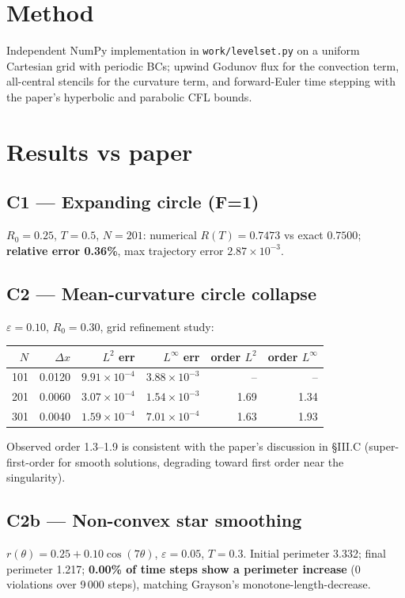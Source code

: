 \documentclass[11pt]{article}
\begin{document}
\section{Method}
Independent NumPy implementation in \texttt{work/levelset.py} on a uniform
Cartesian grid with periodic BCs; upwind Godunov flux for the convection
term, all-central stencils for the curvature term, and forward-Euler time
stepping with the paper's hyperbolic and parabolic CFL bounds.

\section{Results vs paper}
\subsection*{C1 --- Expanding circle (F=1)}
$R_0=0.25$, $T=0.5$, $N=201$: numerical $R(T)=0.7473$ vs exact $0.7500$;
\textbf{relative error 0.36\%}, max trajectory error $2.87\times10^{-3}$.

\subsection*{C2 --- Mean-curvature circle collapse}
$\varepsilon=0.10$, $R_0=0.30$, grid refinement study:
\begin{center}
\begin{tabular}{@{}rrrrrr@{}}
\toprule
$N$ & $\Delta x$ & $L^{2}$ err & $L^{\infty}$ err & order $L^{2}$ & order $L^{\infty}$ \\
\midrule
101 & 0.0120 & $9.91{\times}10^{-4}$ & $3.88{\times}10^{-3}$ & --   & --   \\
201 & 0.0060 & $3.07{\times}10^{-4}$ & $1.54{\times}10^{-3}$ & 1.69 & 1.34 \\
301 & 0.0040 & $1.59{\times}10^{-4}$ & $7.01{\times}10^{-4}$ & 1.63 & 1.93 \\
\bottomrule
\end{tabular}
\end{center}
Observed order 1.3--1.9 is consistent with the paper's discussion in
\S III.C (super-first-order for smooth solutions, degrading toward first
order near the singularity).

\subsection*{C2b --- Non-convex star smoothing}
$r(\theta) = 0.25 + 0.10\cos(7\theta)$, $\varepsilon=0.05$, $T=0.3$.
Initial perimeter 3.332; final perimeter 1.217; \textbf{0.00\% of time
steps show a perimeter increase} (0 violations over 9\,000 steps),
matching Grayson's monotone-length-decrease.
\end{document}
